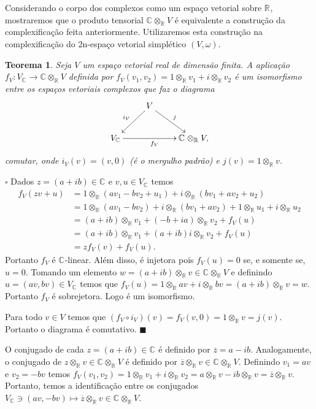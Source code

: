 \documentclass[12pt]{book}
\newtheorem{teorema}{Teorema}[section]
\newenvironment{prova}[1]{$\square$ #1}{\hfill$\blacksquare$}
\newcommand{\complexificacao}[1]{#1_{\complexo{}}}
\newcommand{\complexificacaotensorial}[1]{\complexo{}\otimes_{\reta} #1}
\newcommand{\complexificacaoelemento}[2]{#1\otimes_{\reta} #2}
\newcommand{\complexo}[1]{\mathbb{C}^{#1}}
\newcommand{\real}[1]{\mathbb{R}^{#1}}
\newcommand{\reta}{\real{}}
\begin{document}
	Considerando o corpo dos complexos como um espaço vetorial sobre $\reta$, mostraremos que o produto tensorial $\complexificacaotensorial{V}$ é equivalente a construção da complexificação feita anteriormente. Utilizaremos esta construção na complexificação do 2n-espaço vetorial simplético $(V, \omega)$.
	
	\begin{teorema}\label{teorema_isomorfismo_complexificacao}
		Seja $V$ um espaço vetorial real de dimensão finita. A aplicação $f_{V}: \complexificacao{V} \to \complexificacaotensorial{V}$ definida por  $f_{V}(v_{1},v_{2}) = 1\otimes_{\reta} v_{1} + i \otimes_{\reta} v_{2}$ é um isomorfismo entre os espaços vetoriais complexos que faz o diagrama
		$$
		\xymatrix{
			& V\ar[dl]_{i_{V}}\ar[rd]^{j} &
			\\
			\complexificacao{V}\ar[rr]_{f_{V}}& & \complexificacaotensorial{V},
		}
		$$
		comutar, onde $i_{V}(v) = (v,0)$ (é o mergulho padrão) e $j(v) = 1\otimes_{\reta} v$.
	\end{teorema}
	\begin{prova}
		Dados $z=(a+ib) \in \complexo{}$ e $v,u \in \complexificacao{V}$ temos
		$$
		\begin{aligned}
		f_{V}(zv+u) &= 1\otimes_{\reta} (a v_{1} - bv_{2} + u_{1}) + i \otimes_{\reta} (bv_{1}+av_{2} + u_{2})
		\\
		&=1\otimes_{\reta} (a v_{1} - bv_{2}) + i \otimes_{\reta} (bv_{1}+av_{2})+1\otimes_{\reta} u_{1} + i \otimes_{\reta} u_{2}
		\\
		&=(a+ib)\otimes_{\reta}v_{1} + (-b+ia)\otimes_{\reta} v_{2}+f_{V}(u)
		\\
		&=(a+ib)\otimes_{\reta}v_{1} + (a+ib)i\otimes_{\reta} v_{2}+f_{V}(u)
		\\
		&=zf_{V}(v)+f_{V}(u).
		\end{aligned}
		$$
		Portanto $f_{V}$ é $\complexo{}$-linear. Além disso, é injetora pois $f_{V}(u) = 0$ se, e somente se, $u = 0$. Tomando um elemento $w = (a+ib)\otimes_{\reta}v \in \complexificacaotensorial{V} $ e definindo $u = (av, bv) \in \complexificacao{V}$ temos que $f_{V}(u) = \complexificacaoelemento{1}{av} +\complexificacaoelemento{i}{bv} = (a+ib)\otimes_{\reta} v = w$. Portanto $f_{V}$ é sobrejetora. Logo é um isomorfismo.
		
		Para todo $v \in V$ temos que $(f_{V}\circ i_{V})(v) = f_{V}(v, 0) = 1\otimes_{\reta} v = j(v)$. Portanto o diagrama é comutativo.
	\end{prova}
	
	O conjugado de cada $z=(a+ib) \in \complexo{}$ é definido por $\overline{z} = a-ib$. Analogamente, o conjugado de $\complexificacaoelemento{z}{v} \in \complexificacaotensorial{V}$ é definido por $\complexificacaoelemento{\overline{z}}{v} \in \complexificacaotensorial{V}$. Definindo $v_{1} =av$ e $v_{2} = -bv$ temos $f_{V}(v_{1}, v_{2}) =\complexificacaoelemento{1}{v_{1}} +\complexificacaoelemento{i}{v_{2}} = \complexificacaoelemento{a}{v} -\complexificacaoelemento{ib}{v}  =\complexificacaoelemento{\overline{z}}{v}  $. Portanto, temos a identificação entre os conjugados $ \complexificacao{V} \ni (av, -bv) \mapsto \complexificacaoelemento{\overline{z}}{v} \in \complexificacaotensorial{V}$.
	
\end{document}
